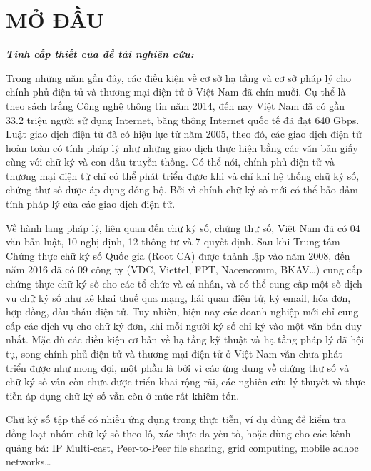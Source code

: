 \chapter*{MỞ ĐẦU}



\vspace*{-0.2cm}
\textit{\textbf{Tính cấp thiết của đề tài nghiên cứu:}}


Trong những năm gần đây, các điều kiện về cơ sở hạ tầng và cơ sở pháp lý cho chính phủ điện tử và thương mại điện tử ở Việt Nam đã chín muồi. Cụ thể là theo sách trắng Công nghệ thông tin năm 2014, đến nay Việt Nam đã có gần 33.2 triệu người sử dụng Internet, băng thông Internet quốc tế đã đạt 640 Gbps. Luật giao dịch điện tử đã có hiệu lực từ năm 2005, theo đó, các giao dịch điện tử hoàn toàn có tính pháp lý như những giao dịch thực hiện bằng các văn bản giấy cùng với chữ ký và con dấu truyền thống. Có thể nói, chính phủ điện tử và thương mại điện tử chỉ có thể phát triển được khi và chỉ khi hệ thống chữ ký số, chứng thư số được áp dụng đồng bộ. Bởi vì chính chữ ký số mới có thể bảo đảm tính pháp lý của các giao dịch điện tử.

Về hành lang pháp lý, liên quan đến chữ ký số, chứng thư số, Việt Nam đã có 04 văn bản luật, 10 nghị định, 12 thông tư và 7 quyết định. Sau khi Trung tâm Chứng thực chữ ký số Quốc gia (Root CA) được thành lập vào năm 2008, đến năm 2016 đã có 09 công ty (VDC, Viettel, FPT, Nacencomm, BKAV\ldots) cung cấp chứng thực chữ ký số cho các tổ chức và cá nhân, và có thể cung cấp một số dịch vụ chữ ký số như kê khai thuế qua mạng, hải quan điện tử, ký email, hóa đơn, hợp đồng, đấu thầu điện tử. Tuy nhiên, hiện nay các doanh nghiệp mới chỉ cung cấp các dịch vụ cho chữ ký đơn, khi mỗi người ký số chỉ ký vào một văn bản duy nhất. Mặc dù các điều kiện cơ bản về hạ tầng kỹ thuật và hạ tầng pháp lý đã hội tụ, song chính phủ điện tử và thương mại điện tử ở Việt Nam vẫn chưa phát triển được như mong đợi, một phần là bởi vì các ứng dụng về chứng thư số và chữ ký số vẫn còn chưa được triển khai rộng rãi, các nghiên cứu lý thuyết và thực tiễn áp dụng chữ ký số vẫn còn ở mức rất khiêm tốn.

Chữ ký số tập thể có nhiều ứng dụng trong thực tiễn, ví dụ dùng để kiểm tra đồng loạt nhóm chữ ký số theo lô, xác thực đa yếu tố, hoặc dùng cho các kênh quảng bá: IP Multi-cast, Peer-to-Peer file sharing, grid computing, mobile adhoc networks\ldots

